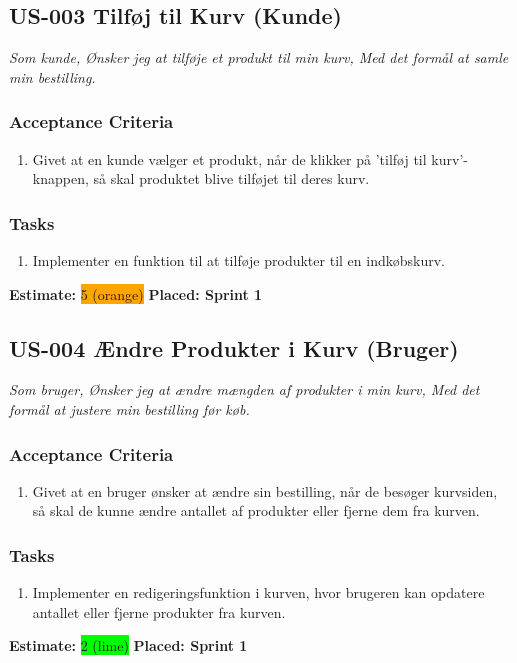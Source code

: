 \subsection{US-003 Tilføj til Kurv (Kunde)}
\label{sec:US-003}
\textit{Som kunde, Ønsker jeg at tilføje et produkt til min kurv, Med det formål at samle min bestilling.}
\subsubsection*{\textbf{Acceptance Criteria}}
\begin{enumerate}
  \item Givet at en kunde vælger et produkt, når de klikker på 'tilføj til kurv'-knappen, så skal produktet blive tilføjet til deres kurv.
\end{enumerate}
\subsubsection*{\textbf{Tasks}}
\begin{enumerate}
  \item Implementer en funktion til at tilføje produkter til en indkøbskurv.
\end{enumerate}
\textbf{Estimate:} \colorbox{orange}{5 (orange)}
\textbf{Placed: Sprint 1}
\par\noindent\dotfill

\subsection{US-004 Ændre Produkter i Kurv (Bruger)}
\label{sec:US-004}
\textit{Som bruger, Ønsker jeg at ændre mængden af produkter i min kurv, Med det formål at justere min bestilling før køb.}
\subsubsection*{\textbf{Acceptance Criteria}}
\begin{enumerate}
  \item Givet at en bruger ønsker at ændre sin bestilling, når de besøger kurvsiden, så skal de kunne ændre antallet af produkter eller fjerne dem fra kurven.
\end{enumerate}
\subsubsection*{\textbf{Tasks}}
\begin{enumerate}
  \item Implementer en redigeringsfunktion i kurven, hvor brugeren kan opdatere antallet eller fjerne produkter fra kurven.
\end{enumerate}
\textbf{Estimate:} \colorbox{lime}{2 (lime)}
\textbf{Placed: Sprint 1}
\par\noindent\dotfill

